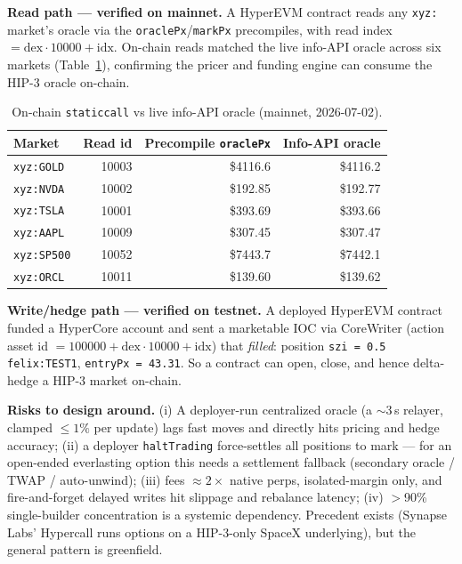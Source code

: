 \documentclass[11pt]{article}
\newcommand{\code}[1]{\texttt{\small #1}}
\begin{document}
\textbf{Read path --- verified on mainnet.} A HyperEVM contract reads any \code{xyz:} market's oracle
via the \code{oraclePx}/\code{markPx} precompiles, with read index $=\text{dex}\cdot 10000+\text{idx}$.
On-chain reads matched the live info-API oracle across six markets (Table~\ref{tab:rwa}), confirming
the pricer and funding engine can consume the HIP-3 oracle on-chain.

\begin{table}[h]
\centering
\begin{tabular}{@{}lrrr@{}}
\toprule
\textbf{Market} & \textbf{Read id} & \textbf{Precompile \code{oraclePx}} & \textbf{Info-API oracle} \\
\midrule
\code{xyz:GOLD}  & 10003 & \$4116.6 & \$4116.2 \\
\code{xyz:NVDA}  & 10002 & \$192.85 & \$192.77 \\
\code{xyz:TSLA}  & 10001 & \$393.69 & \$393.66 \\
\code{xyz:AAPL}  & 10009 & \$307.45 & \$307.47 \\
\code{xyz:SP500} & 10052 & \$7443.7 & \$7442.1 \\
\code{xyz:ORCL}  & 10011 & \$139.60 & \$139.62 \\
\bottomrule
\end{tabular}
\caption{On-chain \code{staticcall} vs live info-API oracle (mainnet, 2026-07-02).}
\label{tab:rwa}
\end{table}

\textbf{Write/hedge path --- verified on testnet.} A deployed HyperEVM contract funded a HyperCore
account and sent a marketable IOC via CoreWriter (action asset id $=100000+\text{dex}\cdot 10000+\text{idx}$)
that \emph{filled}: position \code{szi = 0.5 felix:TEST1}, \code{entryPx = 43.31}. So a contract can
open, close, and hence delta-hedge a HIP-3 market on-chain.

\textbf{Risks to design around.} (i) A deployer-run centralized oracle (a $\sim$3\,s relayer,
clamped $\leq 1\%$ per update) lags fast moves and directly hits pricing and hedge accuracy; (ii) a
deployer \code{haltTrading} force-settles all positions to mark --- for an open-ended everlasting
option this needs a settlement fallback (secondary oracle / TWAP / auto-unwind); (iii) fees
$\approx 2\times$ native perps, isolated-margin only, and fire-and-forget delayed writes hit
slippage and rebalance latency; (iv) $>$90\% single-builder concentration is a systemic dependency.
Precedent exists (Synapse Labs' Hypercall runs options on a HIP-3-only SpaceX underlying), but the
general pattern is greenfield.
\end{document}
